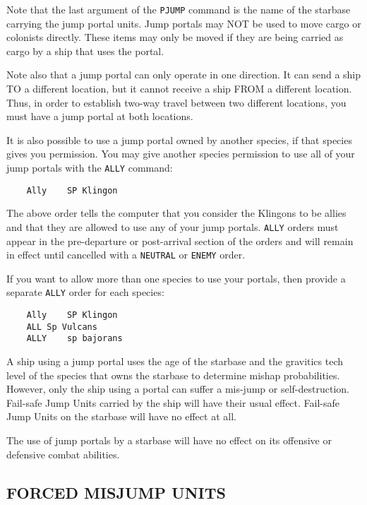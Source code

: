\documentclass[10pt,titlepage]{article}
\begin{document}
Note that the last argument of the \texttt{PJUMP} command is the name of the starbase
carrying the jump portal units.  Jump portals may NOT be used to move cargo or
colonists directly.  These items may only be moved if they are being carried
as cargo by a ship that uses the portal.

Note also that a jump portal can only operate in one direction.  It can send
a ship TO a different location, but it cannot receive a ship FROM a different
location.  Thus, in order to establish two-way travel between two different
locations, you must have a jump portal at both locations.

It is also possible to use a jump portal owned by another species, if that
species gives you permission.  You may give another species permission to
use all of your jump portals with the \texttt{ALLY} command:

\begin{verbatim}
	Ally	SP Klingon\end{verbatim} 

The above order tells the computer that you consider the Klingons to be allies
and that they are allowed to use any of your jump portals.  \texttt{ALLY} orders must
appear in the pre-departure or post-arrival section of the orders and will
remain in effect until cancelled with a \texttt{NEUTRAL} or \texttt{ENEMY} order.

If you want to allow more than one species to use your portals, then provide
a separate \texttt{ALLY} order for each species:

\begin{verbatim}
	Ally	SP Klingon
	ALL	Sp Vulcans
	ALLY	sp bajorans\end{verbatim} 

A ship using a jump portal uses the age of the starbase and the gravitics
tech level of the species that owns the starbase to determine mishap
probabilities.  However, only the ship using a portal can suffer a mis-jump
or self-destruction.  Fail-safe Jump Units carried by the ship will have
their usual effect.  Fail-safe Jump Units on the starbase will have no
effect at all.

The use of jump portals by a starbase will have no effect on its offensive or
defensive combat abilities.

\newpage
\subsection{FORCED MISJUMP UNITS}
\end{document}
